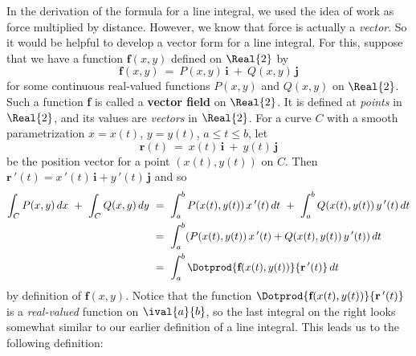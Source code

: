 In the derivation of the formula for a line integral, we used the idea of work as force multiplied by distance.
However, we know that force is actually a \emph{vector}. So it would be helpful to develop a vector form for a
line integral. For this, suppose that we have a function $\textbf{f}(x,y)$ defined on $\Real{2}$ by
\begin{displaymath}
 \textbf{f}(x,y) ~=~ P(x,y)\,\textbf{i} ~+~ Q(x,y)\,\textbf{j}
\end{displaymath}
for some continuous real-valued functions $P(x,y)$ and $Q(x,y)$ on $\Real{2}$. Such a function \textbf{f} is called a
\textbf{vector field} on $\Real{2}$. It is defined at \emph{points} in $\Real{2}$, and its values are
\emph{vectors} in $\Real{2}$. For a curve $C$ with a smooth parametrization $x=x(t)$, $y=y(t)$, $a \le t \le b$,
let
\begin{displaymath}
 \textbf{r}(t) ~=~ x(t)\,\textbf{i} ~+~ y(t)\,\textbf{j}
\end{displaymath}
be the position vector for a point $(x(t),y(t))$ on $C$. Then
$\textbf{r}\,'(t) = x\,'(t)\,\textbf{i} + y\,'(t)\,\textbf{j}$ and so
\begin{align*}
 \int_C P(x,y)\,dx ~+~ \int_C Q(x,y)\,dy ~&=~ \int_a^b P(x(t),y(t)) \,x\,'(t)\,dt ~+~ \int_a^b Q(x(t),y(t)) \,y\,'(t)\,dt\\
  &=~ \int_a^b (P(x(t),y(t)) \,x\,'(t) + Q(x(t),y(t)) \,y\,'(t))\,dt\\
  &=~ \int_a^b \Dotprod{\textbf{f}(x(t),y(t))}{\textbf{r}\,'(t)}\,dt
\end{align*}
by definition of $\textbf{f}(x,y)$. Notice that the function $\Dotprod{\textbf{f}(x(t),y(t))}{\textbf{r}\,'(t)}$
is a \emph{real-valued} function on $\ival{a}{b}$, so the last integral on the right looks somewhat similar to our
earlier definition of a line integral. This leads us to the following definition:

